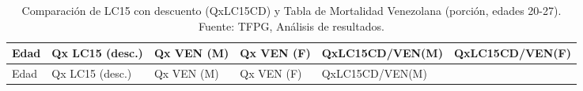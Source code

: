 \documentclass[
  11pt,
  a4paper,
]{article}
\begin{document}
\begin{longtable}[]{@{}
  >{\raggedright\arraybackslash}p{}
  >{\raggedright\arraybackslash}p{}
  >{\raggedright\arraybackslash}p{}
  >{\raggedright\arraybackslash}p{}
  >{\raggedright\arraybackslash}p{}
  >{\raggedright\arraybackslash}p{}@{}}
\caption{Comparación de LC15 con descuento (QxLC15CD) y Tabla de
Mortalidad Venezolana (porción, edades 20-27). Fuente: TFPG, Análisis de
resultados.}\label{tbl-lc15cd-ven}\tabularnewline
\toprule\noalign{}
\begin{minipage}[b]{\linewidth}\raggedright
Edad
\end{minipage} & \begin{minipage}[b]{\linewidth}\raggedright
Qx LC15 (desc.)
\end{minipage} & \begin{minipage}[b]{\linewidth}\raggedright
Qx VEN (M)
\end{minipage} & \begin{minipage}[b]{\linewidth}\raggedright
Qx VEN (F)
\end{minipage} & \begin{minipage}[b]{\linewidth}\raggedright
QxLC15CD/VEN(M)
\end{minipage} & \begin{minipage}[b]{\linewidth}\raggedright
QxLC15CD/VEN(F)
\end{minipage} \\
\midrule\noalign{}
\endfirsthead
\toprule\noalign{}
\begin{minipage}[b]{\linewidth}\raggedright
Edad
\end{minipage} & \begin{minipage}[b]{\linewidth}\raggedright
Qx LC15 (desc.)
\end{minipage} & \begin{minipage}[b]{\linewidth}\raggedright
Qx VEN (M)
\end{minipage} & \begin{minipage}[b]{\linewidth}\raggedright
Qx VEN (F)
\end{minipage} & \begin{minipage}[b]{\linewidth}\raggedright
QxLC15CD/VEN(M)
\end{minipage} & \begin{minipage}[b]{\linewidth}\raggedright

\end{minipage}
\end{longtable}
\end{document}
